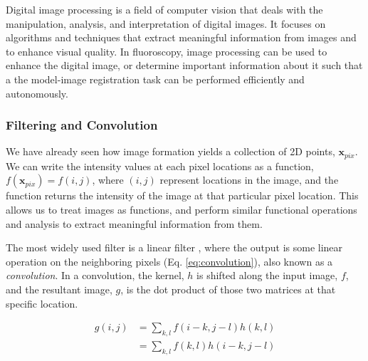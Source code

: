 Digital image processing is a field of computer vision that deals with the manipulation, analysis, and interpretation of digital images. It focuses on algorithms and techniques that extract meaningful information from images and to enhance visual quality. In fluoroscopy, image processing can be used to enhance the digital image, or determine important information about it such that a the model-image registration task can be performed efficiently and autonomously.

\subsubsection{Filtering and Convolution}
We have already seen how image formation yields a collection of 2D points, $\mathbf{x}_{pix}$. We can write the intensity values at each pixel locations as a function, $f(\mathbf{x}_{pix}) = f(i,j)$, where $(i,j)$ represent locations in the image, and the function returns the intensity of the image at that particular pixel location. This allows us to treat images as functions, and perform similar functional operations and analysis to extract meaningful information from them.

The most widely used filter is a linear filter \cite{szeliskiComputerVisionAlgorithms2022}, where the output is some linear operation on the neighboring pixels (Eq. \ref{eq:convolution}), also known as a \emph{convolution}. In a convolution, the kernel, $h$ is shifted along the input image, $f$, and the resultant image, $g$, is the dot product of those two matrices at that specific location.

\begin{equation}
    \begin{aligned}
        g(i,j) &= \sum_{k,l}f(i-k,j-l)h(k,l) \\
        &= \sum_{k,l}f(k,l)h(i-k,j-l)
    \end{aligned}
    \label{eq:convolution}
\end{equation}

